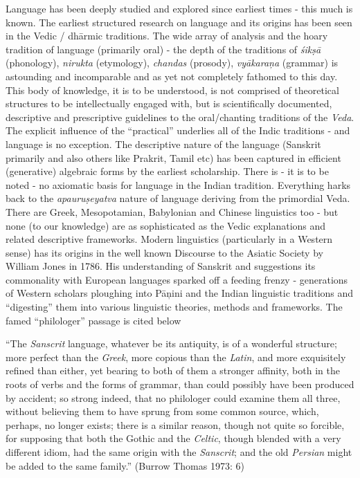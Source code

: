 Language has been deeply studied and explored since earliest times - this much is known. The earliest structured research on language and its origins has been seen in the Vedic / dhārmic traditions. The wide array of analysis and the hoary tradition of language (primarily oral) - the depth of the traditions of \textit{śikṣā} (phonology), \textit{nirukta} (etymology), \textit{chandas} (prosody), \textit{vyākaraņa} (grammar) is astounding and incomparable and as yet not completely fathomed to this day. This body of knowledge, it is to be understood, is not comprised of theoretical structures to be intellectually engaged with, but is scientifically documented, descriptive and prescriptive guidelines to the oral/chanting traditions of the \textit{Veda}. The explicit influence of the “practical” underlies all of the Indic traditions - and language is no exception. The descriptive nature of the language (Sanskrit primarily and also others like Prakrit, Tamil etc) has been captured in efficient (generative) algebraic forms by the earliest scholarship. There is - it is to be noted - no axiomatic basis for language in the Indian tradition. Everything harks back to the \textit{apauruṣeyatva} nature of language deriving from the primordial Veda. There are Greek, Mesopotamian, Babylonian and Chinese linguistics too - but none (to our knowledge) are as sophisticated as the Vedic explanations and related descriptive frameworks. Modern linguistics (particularly in a Western sense) has its origins in the well known Discourse to the Asiatic Society by William Jones in 1786. His understanding of Sanskrit and suggestions its commonality with European languages sparked off a feeding frenzy - generations of Western scholars ploughing into Pāņini and the Indian linguistic traditions and “digesting” them into various linguistic theories, methods and frameworks. The famed “philologer” passage is cited below

\vskip 4pt

\begin{myquote}
“The \textit{Sanscrit} language, whatever be its antiquity, is of a wonderful structure; more perfect than the \textit{Greek}, more copious than the \textit{Latin}, and more exquisitely refined than either, yet bearing to both of them a stronger affinity, both in the roots of verbs and the forms of grammar, than could possibly have been produced by accident; so strong indeed, that no philologer could examine them all three, without believing them to have sprung from some common source, which, perhaps, no longer exists; there is a similar reason, though not quite so forcible, for supposing that both the Gothic and the \textit{Celtic}, though blended with a very different idiom, had the same origin with the \textit{Sanscrit}; and the old \textit{Persian} might be added to the same family.” (Burrow Thomas 1973: 6)
\end{myquote}

